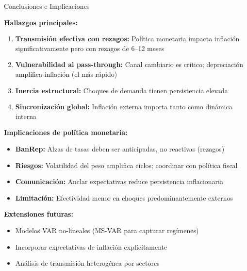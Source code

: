 \documentclass{beamer}
\begin{document}
\begin{frame}{Conclusiones e Implicaciones}

\textbf{Hallazgos principales:}
\begin{enumerate}
\item \textbf{Transmisión efectiva con rezagos:} Política monetaria impacta inflación significativamente pero con rezagos de 6--12 meses
\item \textbf{Vulnerabilidad al pass-through:} Canal cambiario es crítico; depreciación amplifica inflación (el más rápido)
\item \textbf{Inercia estructural:} Choques de demanda tienen persistencia elevada
\item \textbf{Sincronización global:} Inflación externa importa tanto como dinámica interna
\end{enumerate}

\vspace{0.3cm}
\textbf{Implicaciones de política monetaria:}
\begin{itemize}
\item \textbf{BanRep:} Alzas de tasas deben ser anticipadas, no reactivas (rezagos)
\item \textbf{Riesgos:} Volatilidad del peso amplifica ciclos; coordinar con política fiscal
\item \textbf{Comunicación:} Anclar expectativas reduce persistencia inflacionaria
\item \textbf{Limitación:} Efectividad menor en choques predominantemente externos
\end{itemize}

\vspace{0.3cm}
\textbf{Extensiones futuras:}
\begin{itemize}
\item Modelos VAR no-lineales (MS-VAR para capturar regímenes)
\item Incorporar expectativas de inflación explícitamente
\item Análisis de transmisión heterogénea por sectores
\end{itemize}
\end{frame}
\end{document}
